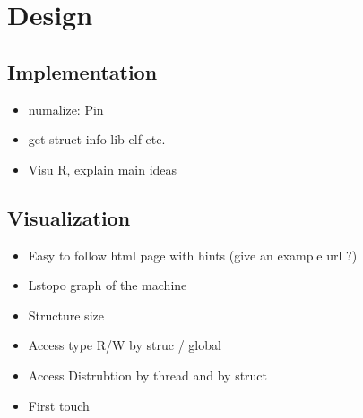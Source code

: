 
\section{Design}
\subsection{Implementation}
\label{sec:design}
\begin{itemize}
    \item numalize: Pin \cite{Luk05Pin}
    \item get struct info lib elf etc.
    \item Visu R, explain main ideas
\end{itemize}
\subsection{Visualization}

\begin{itemize}
    \item Easy to follow html page with hints (give an example url ?)
    \item Lstopo graph of the machine
    \item Structure size
    \item Access type R/W by struc / global
    \item Access Distrubtion by thread and by struct
    \item First touch
\end{itemize}

